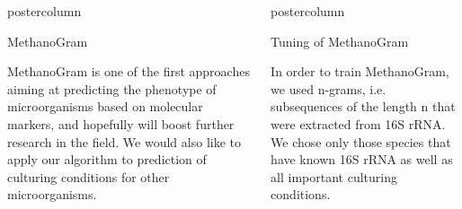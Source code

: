 \documentclass[final]{beamer}\usepackage[]{graphicx}\usepackage[]{color}
\newlength{\columnheight}
\begin{document}
\begin{frame}
\begin{columns}
\begin{column}{.53\textwidth}
\begin{beamercolorbox}[center,wd=\textwidth]{postercolumn}
\begin{minipage}[T]{.95\textwidth}
{\begin{block}{MethanoGram}

MethanoGram is one of the first approaches aiming at predicting the phenotype of microorganisms based on molecular markers, and hopefully will boost further research in the field. We would also like to apply our algorithm to prediction of culturing conditions for other microorganisms.


\end{block}


}
\end{minipage}
\end{beamercolorbox}
\end{column}



\begin{column}{.48\textwidth}
\begin{beamercolorbox}[center,wd=\textwidth]{postercolumn}
\begin{minipage}[T]{.95\textwidth}  
\parbox[t][\columnheight]{\textwidth}
{








\begin{block}{Tuning of MethanoGram}

In order to train MethanoGram, we used n-grams, i.e. subsequences of the length n that were extracted from 16S rRNA. We chose only those species that have known 16S rRNA as well as all important culturing conditions. 


\end{block}}
\end{minipage}
\end{beamercolorbox}
\end{column}
\end{columns}
\end{frame}
\end{document}
